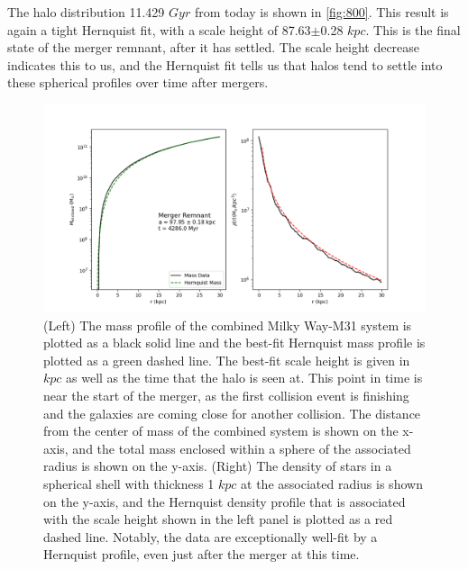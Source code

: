 \documentclass[linenumbers]{aastex631}
\begin{document}
The halo distribution 11.429 $Gyr$ from today is shown in \ref{fig:800}. This result is again a tight Hernquist fit, with a scale height of 87.63$\pm$0.28 $kpc$. This is the final state of the merger remnant, after it has settled. The scale height decrease indicates this to us, and the Hernquist fit tells us that halos tend to settle into these spherical profiles over time after mergers.

\begin{figure}
    \centering
    \includegraphics[width=\textwidth]{Snap300FitswithConcat.png}
    \caption{(Left) The mass profile of the combined Milky Way-M31 system is plotted as a black solid line and the best-fit Hernquist mass profile is plotted as a green dashed line. The best-fit scale height is given in $kpc$ as well as the time that the halo is seen at. This point in time is near the start of the merger, as the first collision event is finishing and the galaxies are coming close for another collision. The distance from the center of mass of the combined system is shown on the x-axis, and the total mass enclosed within a sphere of the associated radius is shown on the y-axis. (Right) The density of stars in a spherical shell with thickness 1 $kpc$ at the associated radius is shown on the y-axis, and the Hernquist density profile that is associated with the scale height shown in the left panel is plotted as a red dashed line. Notably, the data are exceptionally well-fit by a Hernquist profile, even just after the merger at this time.}
    \label{fig:300}
\end{figure}
\end{document}
